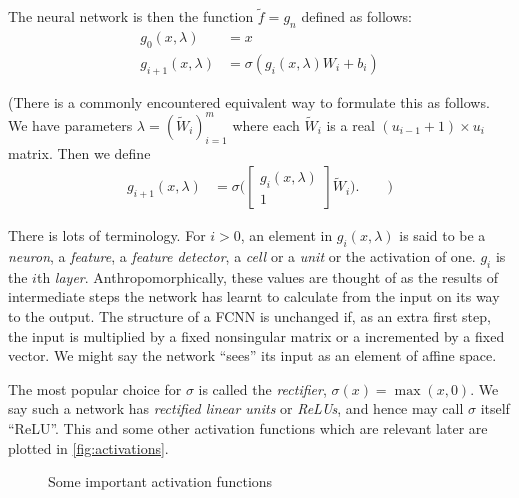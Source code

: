 The neural network is then the function $\tilde f=g_n$ defined as follows:
\begin{align}
  g_{0}(x,\lambda)&=x\\
  g_{i+1}(x,\lambda)&=\sigma(g_i(x,\lambda)W_i+b_i)
\end{align}

(There is a commonly encountered equivalent way to formulate this as follows. We have parameters $\lambda=(\tilde W_i)_{i=1}^m$ where each  $\tilde W_i$ is a real $(u_{i-1}+1)\times u_i$ matrix. Then we define
  \begin{align}
  g_{i+1}(x,\lambda)&=\sigma\Big(\begin{bmatrix}g_i(x,\lambda)\\1\end{bmatrix}\tilde W_i\Big).\qquad)%
  \end{align}

There is lots of terminology. For $i>0$, an element in $g_{i}(x,\lambda)$ is said to be a \emph{neuron}, a \emph{feature}, a \emph{feature detector}, a \emph{cell} or a \emph{unit} or the activation of one. $g_i$ is the $i$th \emph{layer}.
Anthropomorphically, these values are thought of as the results of intermediate steps the network has learnt to calculate from the input on its way to the output.
The structure of a FCNN is unchanged if, as an extra first step, the input is multiplied by a fixed nonsingular matrix or a incremented by a fixed vector.
We might say the network ``sees'' its input as an element of affine space.

The most popular choice for $\sigma$ is called the \emph{rectifier}, $\sigma(x)=\max(x,0)$. We say such a network has \emph{rectified linear units} or \emph{ReLUs}, and hence may call $\sigma$ itself ``ReLU''. This and some other activation functions which are relevant later are plotted in \autoref{fig:activations}.
\begin{figure}

\caption{\label{fig:activations}Some important activation functions}
\end{figure}

